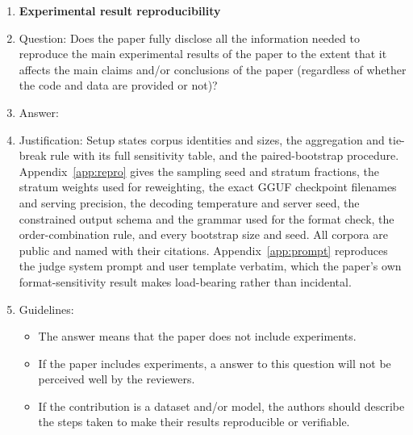 \documentclass{article}
\begin{document}
\begin{enumerate}
\item {\bf Experimental result reproducibility}
    \item[] Question: Does the paper fully disclose all the information needed to reproduce the main experimental results of the paper to the extent that it affects the main claims and/or conclusions of the paper (regardless of whether the code and data are provided or not)?
    \item[] Answer: \answerYes{}
    \item[] Justification: Setup states corpus identities and sizes, the aggregation and tie-break rule with its full sensitivity table, and the paired-bootstrap procedure. Appendix~\ref{app:repro} gives the sampling seed and stratum fractions, the stratum weights used for reweighting, the exact GGUF checkpoint filenames and serving precision, the decoding temperature and server seed, the constrained output schema and the grammar used for the format check, the order-combination rule, and every bootstrap size and seed. All corpora are public and named with their citations. Appendix~\ref{app:prompt} reproduces the judge system prompt and user template verbatim, which the paper's own format-sensitivity result makes load-bearing rather than incidental.
    \item[] Guidelines:
    \begin{itemize}
        \item The answer \answerNA{} means that the paper does not include experiments.
        \item If the paper includes experiments, a \answerNo{} answer to this question will not be perceived well by the reviewers.
        \item If the contribution is a dataset and/or model, the authors should describe the steps taken to make their results reproducible or verifiable.
    \end{itemize}


\end{enumerate}
\end{document}
